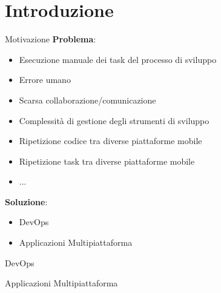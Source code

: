 
\section{Introduzione}

\begin{frame}{Motivazione}
    \textbf{Problema}:
    \begin{itemize}
        \item Esecuzione manuale dei task del processo di sviluppo
        \item Errore umano
        \item Scarsa collaborazione/comunicazione
        \item Complessità di gestione degli strumenti di sviluppo
        \item Ripetizione codice tra diverse piattaforme mobile
        \item Ripetizione task tra diverse piattaforme mobile
        \item ...
    \end{itemize}
    
    \vspace{10mm}
    
    \textbf{Soluzione}:
    \begin{itemize}
        \item DevOps
        \item Applicazioni Multipiattaforma
    \end{itemize}
\end{frame}

\begin{frame}{DevOps}
    
\end{frame}

\begin{frame}{Applicazioni Multipiattaforma}
    
\end{frame}